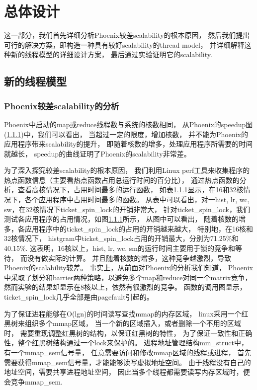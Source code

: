 \section{总体设计}
这一部分，我们首先详细分析Phoenix较差scalability的根本原因，
然后我们提出可行的解决方案，即构造一种具有较好scalability的thread model，
并详细解释这种新的线程模型的详细设计方案，
最后通过实验证明它的scalability.

\subsection{新的线程模型}
\subsubsection{Phoenix较差scalability的分析}
Phoenix中启动的map或reduce线程数与系统的核数相同，
从Phoenix的speedup图(\ref{})中，我们可以看出，
当超过一定的限度，增加核数，
并不能为Phoenix的应用程序带来scalability的提升，
即随着核数的增多，处理应用程序所需要的时间就越长，
speedup的曲线证明了Phoenix的scalability非常差。

为了深入探究较差scalability的根本原因，
我们利用Linux perf工具来收集程序的热点函数信息（主要看热点函数占用总运行时间的百分比），
通过热点函数的分析，查看高核情况下，占用时间最多的运行函数，
如表\ref{}显示，在16和32核情况下，各个应用程序中占用时间最多的函数。
从表中可以看出，对一hist, lr, wc, sw，在32核情况下ticket\_spin\_lock的开销非常大，
针对ticket\_spin\_lock，我们测试各应用程序的占用情况，如图\ref{}所示，
从图中可以看出，
随着核数的增多，各应用程序中的ticket\_spin\_lock的占用的开销越来越大，
特别地，在16核和32核情况下，
histgram中ticket\_spin\_lock占用的开销最大，分别为71.25\%和40.15\%.
这表明，16核以上，hist, lr, wc, sm的运行时间主要用于锁的竞争和等待，
而没有做实际的计算。
并且随着核数的增多，这种竞争越激烈，导致Phoenix的scalability较差。
事实上，从前面对Phoenix的分析我们知道，
Phoenix中采取了划分和barrier两种策略，以避免多个map和reduce对同一个matrix竞争，
然而实验的结果却显示在8核以上，依然有很激烈的竞争。
函数的调用图显示，ticket\_spin\_lock几乎全部是由pagefault引起的。


为了保证进程能够在O(lgn)的时间读写查找mmap的内存区域，
linux采用一个红黑树来组织多个mmap区域，
当一个新的区域插入，或者删除一个不用的区域时，
需要重现调整红黑树的结构，以保证红黑树的特性，
为了保证一致性和正确性，整个红黑树结构通过一个lock来保护的。
进程地址管理结构mm\_struct中，有一个mmap\_sem信号量，
任意需要访问和修改mmap区域的线程或进程，
首先需要获得mmap\_sem信号量，才能能够读写虚拟地址空间。
由于线程没有自己的地址空间，需要共享进程地址空间，
因此当多个线程都需要读写内存区域时，便会竞争mmap\_sem.

